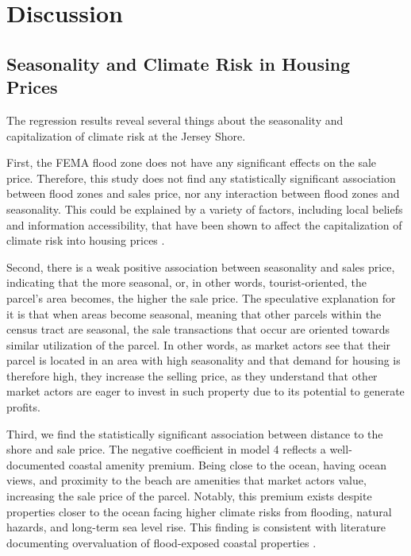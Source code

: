 \documentclass[11pt]{article}
\begin{document}
\section{Discussion}

    \subsection{Seasonality and Climate Risk in Housing Prices}

    The regression results reveal several things about the seasonality and capitalization of climate risk at the Jersey Shore. 
        
    First, the FEMA flood zone does not have any significant effects on the sale price. Therefore, this study does not find any statistically significant association between flood zones and sales price, nor any interaction between flood zones and seasonality. This could be explained by a variety of factors, including local beliefs and information accessibility, that have been shown to affect the capitalization of climate risk into housing prices \parencite{hinoburke2020-DoesInformationClimate, chen2025-DoesPublicConcern, baldaufetal2020-DoesClimateChange}. 

    Second, there is a weak positive association between seasonality and sales price, indicating that the more seasonal, or, in other words, tourist-oriented, the parcel's area becomes, the higher the sale price. The speculative explanation for it is that when areas become seasonal, meaning that other parcels within the census tract are seasonal, the sale transactions that occur are oriented towards similar utilization of the parcel. In other words, as market actors see that their parcel is located in an area with high seasonality and that demand for housing is therefore high, they increase the selling price, as they understand that other market actors are eager to invest in such property due to its potential to generate profits. 

    Third, we find the statistically significant association between distance to the shore and sale price. The negative coefficient in model 4 reflects a well-documented coastal amenity premium. Being close to the ocean, having ocean views, and proximity to the beach are amenities that market actors value, increasing the sale price of the parcel. Notably, this premium exists despite properties closer to the ocean facing higher climate risks from flooding, natural hazards, and long-term sea level rise. This finding is consistent with literature documenting overvaluation of flood-exposed coastal properties \parencite{gourevitchetal2023-UnpricedClimateRisk, murfinspiegel2020-RiskSeaLevel}. 
\end{document}
